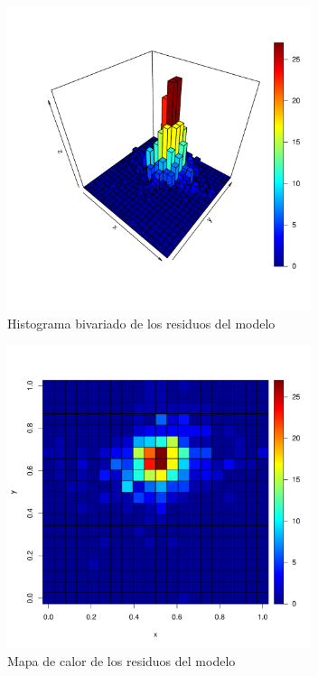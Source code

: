 \documentclass[12pt, twoside]{book}\usepackage[]{graphicx}\usepackage[]{color}
\makeatletter
\newenvironment{kframe}{%
 \def\at@end@of@kframe{}%
 \ifinner\ifhmode%
  \def\at@end@of@kframe{\end{minipage}}%
  \begin{minipage}{\columnwidth}%
 \fi\fi%
 \def\FrameCommand##1{\hskip\@totalleftmargin \hskip-\fboxsep
 \colorbox{shadecolor}{##1}\hskip-\fboxsep
     \hskip-\linewidth \hskip-\@totalleftmargin \hskip\columnwidth}%
 \MakeFramed {\advance\hsize-\width
   \@totalleftmargin\z@ \linewidth\hsize
   \@setminipage}}%
 {\par\unskip\endMakeFramed%
 \at@end@of@kframe}
\newenvironment{knitrout}{}{} %
\numberwithin{equation}{section}
\numberwithin{theorem}{section}
\numberwithin{teorema}{section}
\numberwithin{defi}{section}
\numberwithin{prop}{section}
\numberwithin{defi}{section}
\theoremstyle{plain}
\makeatother
\begin{document}
\begin{knitrout}
\color{fgcolor}\begin{kframe}


{\ttfamily\noindent\bfseries\color{errorcolor}{\#\# Error in residuals(mono\_rest): objeto 'mono\_rest' no encontrado}}\end{kframe}\begin{figure}[!htpb]

{\centering \includegraphics[width=3.5in,height=3.5in]{figure/fig-5_11-1} 

}

\caption[Histograma bivariado de los residuos del modelo]{Histograma bivariado de los residuos del modelo}\label{fig:fig-5.11}
\end{figure}


\end{knitrout}

\begin{knitrout}
\color{fgcolor}\begin{figure}[!htpb]

{\centering \includegraphics[width=3.5in,height=3.5in]{figure/fig-5_12-1} 

}

\caption[Mapa de calor de los residuos del modelo]{Mapa de calor de los residuos del modelo}\label{fig:fig-5.12}
\end{figure}


\end{knitrout}
\end{document}

